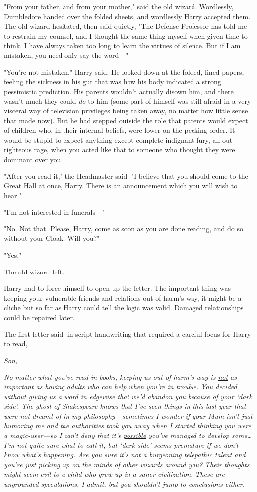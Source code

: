 "From your father, and from your mother," said the old wizard. Wordlessly, 
Dumbledore handed over the folded sheets, and wordlessly Harry accepted them. 
The old wizard hesitated, then said quietly, "The Defense Professor has told me 
to restrain my counsel, and I thought the same thing myself when given time to 
think. I have always taken too long to learn the virtues of silence. But if I 
am mistaken, you need only say the word---"

"You're not mistaken," Harry said. He looked down at the folded, lined papers, 
feeling the sickness in his gut that was how his body indicated a strong 
pessimistic prediction. His parents wouldn't actually disown him, and there 
wasn't much they could \emph{do} to him (some part of himself was still afraid 
in a very visceral way of television privileges being taken away, no matter how 
little sense that made now). But he had stepped outside the role that parents 
would expect of children who, in their internal beliefs, were lower on the 
pecking order. It would be stupid to expect anything except complete indignant 
fury, all-out righteous rage, when you acted like that to someone who thought 
they were dominant over you.

"After you read it," the Headmaster said, "I believe that you should come to 
the Great Hall at once, Harry. There is an announcement which you will wish to 
hear."

"I'm not interested in funerals---"

"No. Not that. Please, Harry, come as soon as you are done reading, and do so 
without your Cloak. Will you?"

"Yes."

The old wizard left.

Harry had to force himself to open up the letter. The important thing was 
keeping your vulnerable friends and relations out of harm's way, it might be a 
cliche but so far as Harry could tell the logic was valid. Damaged 
relationships could be repaired later.

The first letter said, in script handwriting that required a careful focus for 
Harry to read,

\emph{Son,}

\emph{No matter what you've read in books, keeping us out of harm's way is 
\underline{not} as important as having adults who can help when you're in 
trouble. You decided without giving us a word in edgewise that we'd abandon you 
because of your `dark side'. The ghost of Shakespeare knows that I've seen 
things in this last year that were not dreamt of in my philosophy---sometimes I 
wonder if your Mum isn't just humoring me and the authorities took you away 
when I started thinking you were a magic-user---so I can't deny that it's 
\underline{possible} you've managed to develop some{\ldots} I'm not quite sure 
what to call it, but `dark side' seems premature if we don't know what's 
happening. Are you sure it's not a burgeoning telepathic talent and you're just 
picking up on the minds of other wizards around you? Their thoughts might seem 
evil to a child who grew up in a saner civilization. These are ungrounded 
speculations, I admit, but you shouldn't jump to conclusions either.}

